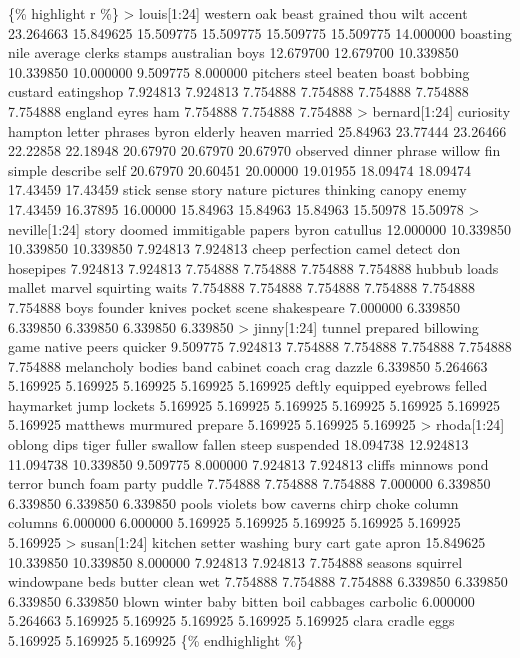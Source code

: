 \documentclass[
  12pt,
]{article}
\begin{document}
\{\% highlight r \%\} \textgreater{} louis{[}1:24{]} western oak beast
grained thou wilt accent 23.264663 15.849625 15.509775 15.509775
15.509775 15.509775 14.000000 boasting nile average clerks stamps
australian boys 12.679700 12.679700 10.339850 10.339850 10.000000
9.509775 8.000000 pitchers steel beaten boast bobbing custard eatingshop
7.924813 7.924813 7.754888 7.754888 7.754888 7.754888 7.754888 england
eyres ham 7.754888 7.754888 7.754888 \textgreater{} bernard{[}1:24{]}
curiosity hampton letter phrases byron elderly heaven married 25.84963
23.77444 23.26466 22.22858 22.18948 20.67970 20.67970 20.67970 observed
dinner phrase willow fin simple describe self 20.67970 20.60451 20.00000
19.01955 18.09474 18.09474 17.43459 17.43459 stick sense story nature
pictures thinking canopy enemy 17.43459 16.37895 16.00000 15.84963
15.84963 15.84963 15.50978 15.50978 \textgreater{} neville{[}1:24{]}
story doomed immitigable papers byron catullus 12.000000 10.339850
10.339850 10.339850 7.924813 7.924813 cheep perfection camel detect don
hosepipes 7.924813 7.924813 7.754888 7.754888 7.754888 7.754888 hubbub
loads mallet marvel squirting waits 7.754888 7.754888 7.754888 7.754888
7.754888 7.754888 boys founder knives pocket scene shakespeare 7.000000
6.339850 6.339850 6.339850 6.339850 6.339850 \textgreater{}
jinny{[}1:24{]} tunnel prepared billowing game native peers quicker
9.509775 7.924813 7.754888 7.754888 7.754888 7.754888 7.754888
melancholy bodies band cabinet coach crag dazzle 6.339850 5.264663
5.169925 5.169925 5.169925 5.169925 5.169925 deftly equipped eyebrows
felled haymarket jump lockets 5.169925 5.169925 5.169925 5.169925
5.169925 5.169925 5.169925 matthews murmured prepare 5.169925 5.169925
5.169925 \textgreater{} rhoda{[}1:24{]} oblong dips tiger fuller swallow
fallen steep suspended 18.094738 12.924813 11.094738 10.339850 9.509775
8.000000 7.924813 7.924813 cliffs minnows pond terror bunch foam party
puddle 7.754888 7.754888 7.754888 7.000000 6.339850 6.339850 6.339850
6.339850 pools violets bow caverns chirp choke column columns 6.000000
6.000000 5.169925 5.169925 5.169925 5.169925 5.169925 5.169925
\textgreater{} susan{[}1:24{]} kitchen setter washing bury cart gate
apron 15.849625 10.339850 10.339850 8.000000 7.924813 7.924813 7.754888
seasons squirrel windowpane beds butter clean wet 7.754888 7.754888
7.754888 6.339850 6.339850 6.339850 6.339850 blown winter baby bitten
boil cabbages carbolic 6.000000 5.264663 5.169925 5.169925 5.169925
5.169925 5.169925 clara cradle eggs 5.169925 5.169925 5.169925 \{\%
endhighlight \%\}
\end{document}
